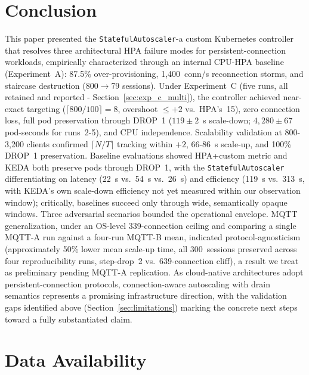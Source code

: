 \documentclass[3p,twocolumn]{elsarticle}
\theoremstyle{plain}%
\theoremstyle{definition}%
\begin{document}
\FloatBarrier
\section{Conclusion}
\label{sec:conclusion}

This paper presented the \texttt{StatefulAutoscaler}-a custom Kubernetes controller that resolves three architectural HPA failure modes for persistent-connection workloads, empirically characterized through an internal CPU-HPA baseline (Experiment~A): 87.5\% over-provisioning, 1,400~conn/s reconnection storms, and staircase destruction (800$\to$79 sessions). Under Experiment~C (five runs, all retained and reported - Section~\ref{sec:exp_c_multi}), the controller achieved near-exact targeting ($\lceil800/100\rceil = 8$, overshoot $\leq +2$ vs.\ HPA's~15), zero connection loss, full pod preservation through DROP~1 ($119\pm2$~s scale-down; $4{,}280\pm67$ pod-seconds for runs~2-5), and CPU independence. Scalability validation at 800-3{,}200 clients confirmed $\lceil N/T \rceil$ tracking within $+2$, 66-86~s scale-up, and 100\% DROP~1 preservation. Baseline evaluations showed HPA+custom metric and KEDA both preserve pods through DROP~1, with the \texttt{StatefulAutoscaler} differentiating on latency (22~s vs.\ 54~s vs.\ 26~s) and efficiency (119~s vs.\ 313~s, with KEDA's own scale-down efficiency not yet measured within our observation window); critically, baselines succeed only through wide, semantically opaque windows. Three adversarial scenarios bounded the operational envelope. MQTT generalization, under an OS-level 339-connection ceiling and comparing a single MQTT-A run against a four-run MQTT-B mean, indicated protocol-agnosticism (approximately 50\% lower mean scale-up time, all 300~sessions preserved across four reproducibility runs, step-drop~2 vs.\ 639-connection cliff), a result we treat as preliminary pending MQTT-A replication. As cloud-native architectures adopt persistent-connection protocols, connection-aware autoscaling with drain semantics represents a promising infrastructure direction, with the validation gaps identified above (Section~\ref{sec:limitations}) marking the concrete next steps toward a fully substantiated claim.



\section*{Data Availability}
\end{document}
